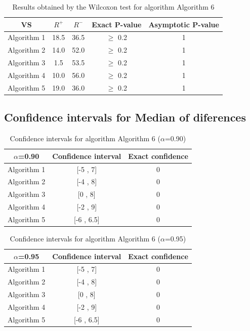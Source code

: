 \documentclass[a4paper,10pt]{article}
\begin{document}
\begin{table}[!htp]
\centering\small
\begin{tabular}{
|c|c|c|c|c|}
\hline
 VS & $R^{+}$ & $R^{-}$ & Exact P-value & Asymptotic P-value \\ \hline 
Algorithm 1 & 18.5 & 36.5 & $\geq$ 0.2 & 1\\ \hline 
Algorithm 2 & 14.0 & 52.0 & $\geq$ 0.2 & 1\\ \hline 
Algorithm 3 & 1.5 & 53.5 & $\geq$ 0.2 & 1\\ \hline 
Algorithm 4 & 10.0 & 56.0 & $\geq$ 0.2 & 1\\ \hline 
Algorithm 5 & 19.0 & 36.0 & $\geq$ 0.2 & 1\\ \hline 

\end{tabular}
\caption{Results obtained by the Wilcoxon test for algorithm Algorithm 6}
\end{table}

\subsection{Confidence intervals for Median of diferences}

\begin{table}[!htp]
\centering\small
\begin{tabular}{
|c|c|c|}
\hline
 $\alpha$=0.90 & Confidence interval & Exact confidence \\ \hline 
Algorithm 1 & [-5 , 7] & 0\\ \hline 
Algorithm 2 & [-4 , 8] & 0\\ \hline 
Algorithm 3 & [0 , 8] & 0\\ \hline 
Algorithm 4 & [-2 , 9] & 0\\ \hline 
Algorithm 5 & [-6 , 6.5] & 0\\ \hline 

\end{tabular}
\caption{Confidence intervals for algorithm Algorithm 6 ($\alpha$=0.90)}
\end{table}
\begin{table}[!htp]
\centering\small
\begin{tabular}{
|c|c|c|}
\hline
 $\alpha$=0.95 & Confidence interval & Exact confidence \\ \hline 
Algorithm 1 & [-5 , 7] & 0\\ \hline 
Algorithm 2 & [-4 , 8] & 0\\ \hline 
Algorithm 3 & [0 , 8] & 0\\ \hline 
Algorithm 4 & [-2 , 9] & 0\\ \hline 
Algorithm 5 & [-6 , 6.5] & 0\\ \hline 

\end{tabular}
\caption{Confidence intervals for algorithm Algorithm 6 ($\alpha$=0.95)}
\end{table}

 \clearpage 
\end{document}
